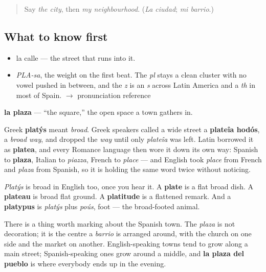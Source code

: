 \label{lesson:ES-C325-plaza}



\begin{quote}
Say \emph{the city}, then \emph{my neighbourhood}. (\emph{La ciudad}; \emph{mi barrio}.)
\end{quote}

\subsection*{What to know first}
\begin{itemize}
\raggedright
  \item la calle — the street that runs into it.
\end{itemize}

\begin{sounds}
\begin{itemize}
\raggedright
  \item \emph{PLA-sa}, the weight on the first beat. The \emph{pl} stays a clean cluster with no vowel pushed in between, and the \emph{z} is an \emph{s} across Latin America and a \emph{th} in most of Spain. $\to$ pronunciation reference
\end{itemize}
\end{sounds}

\begin{cousinweb}
\textbf{la plaza} — \textquotedblleft{}the square,\textquotedblright{} the open space a town gathers in.

Greek \textbf{platýs} meant \emph{broad}. Greek speakers called a wide street a \textbf{plateîa hodós}, a \emph{broad way}, and dropped the \emph{way} until only \emph{plateîa} was left. Latin borrowed it as \textbf{platea}, and every Romance language then wore it down its own way: Spanish to \textbf{plaza}, Italian to \emph{piazza}, French to \emph{place} — and English took \emph{place} from French and \emph{plaza} from Spanish, so it is holding the same word twice without noticing.

\emph{Platýs} is broad in English too, once you hear it. A \textbf{plate} is a flat broad dish. A \textbf{plateau} is broad flat ground. A \textbf{platitude} is a flattened remark. And a \textbf{platypus} is \emph{platýs} plus \emph{poús}, foot — the broad-footed animal.

There is a thing worth marking about the Spanish town. The \emph{plaza} is not decoration; it is the centre a \emph{barrio} is arranged around, with the church on one side and the market on another. English-speaking towns tend to grow along a main street; Spanish-speaking ones grow around a middle, and \textbf{la plaza del pueblo} is where everybody ends up in the evening.
\end{cousinweb}

